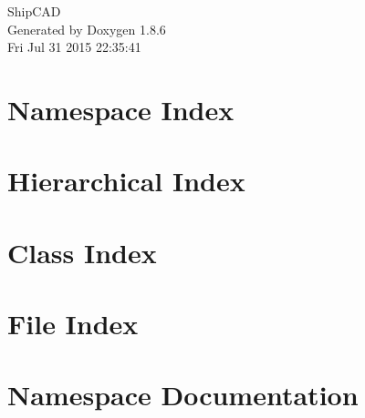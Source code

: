 \documentclass[twoside]{book}
\newcommand{\clearemptydoublepage}{%
  \newpage{\pagestyle{empty}\cleardoublepage}%
}
\begin{document}
\hypersetup{pageanchor=false}
\begin{titlepage}
\vspace*{7cm}
\begin{center}%
{\Large Ship\-C\-A\-D }\\
\vspace*{1cm}
{\large Generated by Doxygen 1.8.6}\\
\vspace*{0.5cm}
{\small Fri Jul 31 2015 22:35:41}\\
\end{center}
\end{titlepage}
\clearemptydoublepage
\tableofcontents
\clearemptydoublepage
{}
\hypersetup{pageanchor=true}

\chapter{Namespace Index}

\chapter{Hierarchical Index}

\chapter{Class Index}

\chapter{File Index}

\chapter{Namespace Documentation}




\end{document}

